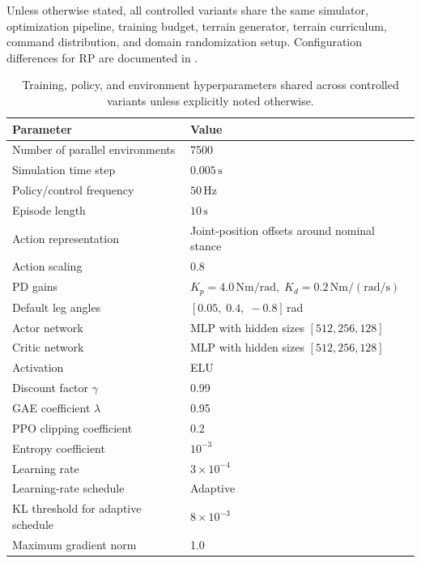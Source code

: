 \documentclass{article}
\newcommand{\baselineFive}{RP}
\begin{document}
    Unless otherwise stated, all controlled variants share the same simulator, optimization pipeline, training budget, terrain generator, terrain curriculum, command distribution, and domain randomization setup. Configuration differences for \baselineFive{} are documented in .
    \begin{table}[htbp]
        \centering
        \small
        \caption{Training, policy, and environment hyperparameters shared across controlled variants unless explicitly noted otherwise.}
        \label{tab:appendix-training-details}
        \begin{tabular}{ll}
            \toprule
            \textbf{Parameter} & \textbf{Value} \\
            \midrule
            Number of parallel environments & 7500 \\
            Simulation time step & \(0.005\,\mathrm{s}\) \\
            Policy/control frequency & \(50\,\mathrm{Hz}\) \\
            Episode length & \(10\,\mathrm{s}\) \\
            Action representation & Joint-position offsets around nominal stance \\
            Action scaling & 0.8 \\
            PD gains & \(K_p = 4.0\,\mathrm{Nm/rad},\; K_d = 0.2\,\mathrm{Nm/(rad/s)}\) \\
            Default leg angles & \([0.05,\;0.4,\;-0.8]\)\,rad \\
            Actor network & MLP with hidden sizes \([512, 256, 128]\) \\
            Critic network & MLP with hidden sizes \([512, 256, 128]\) \\
            Activation & ELU \\
            Discount factor \(\gamma\) & 0.99 \\
            GAE coefficient \(\lambda\) & 0.95 \\
            PPO clipping coefficient & 0.2 \\
            Entropy coefficient & \(10^{-3}\) \\
            Learning rate & \(3\times 10^{-4}\) \\
            Learning-rate schedule & Adaptive \\
            KL threshold for adaptive schedule & \(8\times 10^{-3}\) \\
            Maximum gradient norm & 1.0 \\

\end{tabular}
\end{table}
\end{document}
